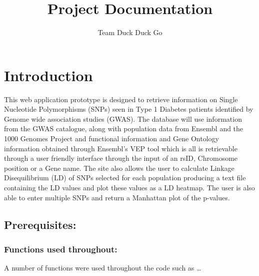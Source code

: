 \documentclass[12pt,a4paper]{article}
\title{Project Documentation}
\author{Team Duck Duck Go}
\date{} %
\begin{document}
\maketitle
\section{Introduction} %


This web application prototype is designed to retrieve information on
Single Nucleotide Polymorphisms (SNPs) seen in Type 1 Diabetes patients
identified by Genome wide association studies (GWAS). The database will
use information from the GWAS catalogue, along with population data from
Ensembl and the 1000 Genomes Project and functional information and Gene
Ontology information obtained through Ensembl's VEP tool which is all is
retrievable through a user friendly interface through the input of an
rsID, Chromosome position or a Gene name. The site also allows the user
to calculate Linkage Disequilibrium (LD) of SNPs selected for each
population producing a text file containing the LD values and plot these
values as a LD heatmap. The user is also able to enter multiple SNPs and
return a Manhattan plot of the p-values.

\subsection{Prerequisites:}


\subsubsection{Functions used throughout:}

A number of functions were used throughout the code such as \ldots{}


\inputminted{python}{code_snippets/db_scripts1.py}


\protect\hypertarget{t.a725f3f15ee101df28c7684965a6bd8a25eed434}{}{}\protect\hypertarget{t.1}{}{}
\end{document}
